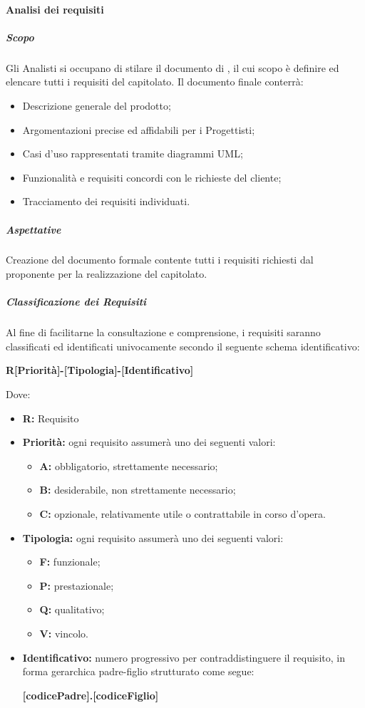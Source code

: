 			\paragraph{Analisi dei requisiti}
				\subparagraph{Scopo}
					Gli Analisti si occupano di stilare il documento di , il cui scopo è definire ed elencare tutti i requisiti del capitolato. Il documento finale conterrà:
					\begin{itemize}
						\item Descrizione generale del prodotto;
						\item Argomentazioni precise ed affidabili per i Progettisti;
						\item Casi d'uso rappresentati tramite diagrammi UML;
						\item Funzionalità e requisiti concordi con le richieste del cliente;
						\item Tracciamento dei requisiti individuati. 
					\end{itemize}
				\subparagraph{Aspettative}
					Creazione del documento formale contente tutti i requisiti richiesti dal proponente per la realizzazione del capitolato.
				\subparagraph{Classificazione dei Requisiti}
					Al fine di facilitarne la consultazione e comprensione, i requisiti saranno classificati ed identificati univocamente secondo il seguente schema identificativo:
					\begin{center}
						\textbf{R[Priorità]-[Tipologia]-[Identificativo]}
					\end{center}
					Dove:
					\begin{itemize}
						\item \textbf{R:} Requisito 
						\item \textbf{Priorità:} ogni requisito assumerà uno dei seguenti valori:
						\begin{itemize}
							\item \textbf{A:} obbligatorio, strettamente necessario;
							\item \textbf{B:} desiderabile, non strettamente necessario;
							\item \textbf{C:} opzionale, relativamente utile o contrattabile in corso d'opera.
						\end{itemize}
						\item \textbf{Tipologia:} ogni requisito assumerà uno dei seguenti valori:
						\begin{itemize}
							\item \textbf{F:} funzionale;
							\item \textbf{P:} prestazionale;
							\item \textbf{Q:} qualitativo;
							\item \textbf{V:} vincolo.
						\end{itemize}
						\item \textbf{Identificativo:} numero progressivo per contraddistinguere il requisito, in forma gerarchica padre-figlio strutturato come segue: 
						\begin{center}
							\textbf{[codicePadre].[codiceFiglio]}
						\end{center}
					\end{itemize}

